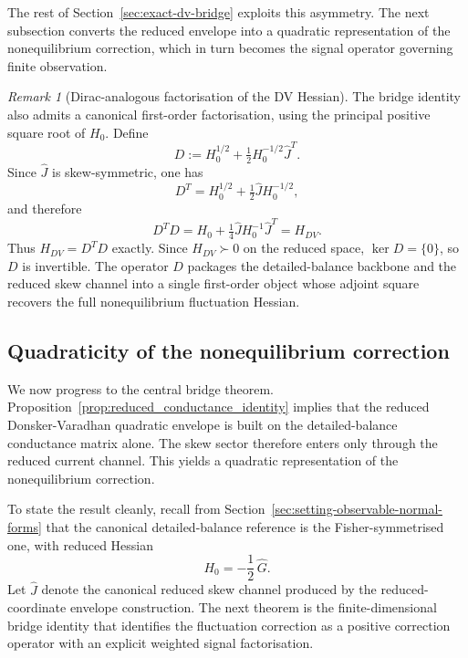 \documentclass[11pt,a4paper]{article}
\numberwithin{equation}{section}
\theoremstyle{thmcompact}
\theoremstyle{remark}
\newtheorem*{remarkplain}{Remark}
\newenvironment{remark}[1][]%
{\begin{remarkbox}\begin{remarkplain}[#1]\normalfont}
		{\end{remarkplain}\end{remarkbox}}
\begin{document}
The rest of Section~\ref{sec:exact-dv-bridge} exploits this asymmetry. The next subsection converts the reduced envelope into a quadratic representation of the nonequilibrium correction, which in turn becomes the signal operator governing finite observation.

\begin{remark}[Dirac-analogous factorisation of the DV Hessian]
\label{rem:dirac-factorisation}
The bridge identity also admits a canonical first-order factorisation, using the
principal positive square root of \(H_0\). Define
\begin{equation}
D := H_0^{1/2} + \tfrac{1}{2}H_0^{-1/2}\widehat{J}^T.
\label{eq:dirac-operator}
\end{equation}
Since \(\widehat{J}\) is skew-symmetric, one has
\begin{equation}
D^T
=
H_0^{1/2} + \tfrac{1}{2}\widehat{J}H_0^{-1/2},
\end{equation}
and therefore
\begin{equation}
D^T D
=
H_0 + \tfrac{1}{4}\widehat{J}H_0^{-1}\widehat{J}^T
=
H_{DV}.
\label{eq:dirac-factorisation}
\end{equation}
Thus \(H_{DV}=D^T D\) exactly. Since \(H_{DV}\succ 0\) on the reduced space,
\(\ker D=\{0\}\), so \(D\) is invertible. The operator \(D\) packages the
detailed-balance backbone and the reduced skew channel into a single
first-order object whose adjoint square recovers the full nonequilibrium
fluctuation Hessian.
\end{remark}

\subsection{Quadraticity of the nonequilibrium correction}

We now progress to the central bridge theorem. Proposition~\ref{prop:reduced_conductance_identity} implies that the reduced Donsker-Varadhan quadratic envelope is built on the detailed-balance conductance matrix alone. The skew sector therefore enters only through the reduced current channel. This yields a quadratic representation of the nonequilibrium correction.

To state the result cleanly, recall from Section~\ref{sec:setting-observable-normal-forms} that the canonical detailed-balance reference is the Fisher-symmetrised one, with reduced Hessian
\begin{equation}
H_0=-\frac12\,\widehat G.
\end{equation}
Let \(\widehat J\) denote the canonical reduced skew channel produced by the reduced-coordinate envelope construction. The next theorem is the finite-dimensional bridge identity that identifies the fluctuation correction as a positive correction operator with an explicit weighted signal factorisation.
\end{document}
